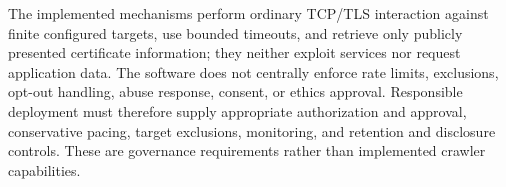 The implemented mechanisms perform ordinary TCP/TLS interaction against finite
configured targets, use bounded timeouts, and retrieve only publicly presented
certificate information; they neither exploit services nor request application
data. The software does not centrally enforce rate limits, exclusions, opt-out
handling, abuse response, consent, or ethics approval. Responsible deployment
must therefore supply appropriate authorization and approval, conservative
pacing, target exclusions, monitoring, and retention and disclosure controls.
These are governance requirements rather than implemented crawler capabilities.

